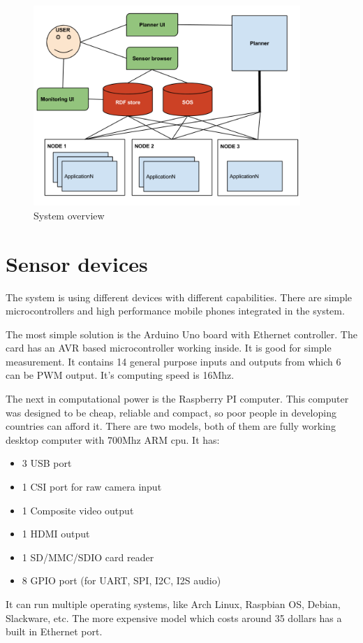 \begin{figure}[h]
	\centering
	\includegraphics[width=0.9\textwidth]{figures/sysarch.png}
	\caption{System overview\label{fig:sysover}}
\end{figure}

\section{Sensor devices}
The system is using different devices with different capabilities. There are simple microcontrollers and high performance mobile phones integrated in the system. 

The most simple solution is the Arduino Uno board with Ethernet controller. The card has an AVR based microcontroller working inside. It is good for simple measurement. It contains 14 general purpose inputs and outputs from which 6 can be PWM output. It's computing speed is 16Mhz.

The next in computational power is the Raspberry PI computer. This computer was designed to be cheap, reliable and compact, so poor people in developing countries can afford it. There are two models, both of them are fully working desktop computer with 700Mhz ARM cpu. It has:
\begin{itemize}
	\item 3 USB port
	\item 1 CSI port for raw camera input
	\item 1 Composite video output
	\item 1 HDMI output
	\item 1 SD/MMC/SDIO card reader
	\item 8 GPIO port (for UART, SPI, I2C, I2S audio)
\end{itemize} 
 It can run multiple operating systems, like Arch Linux, Raspbian OS, Debian, Slackware, etc. The more expensive model which costs around 35 dollars has a built in Ethernet port.  

